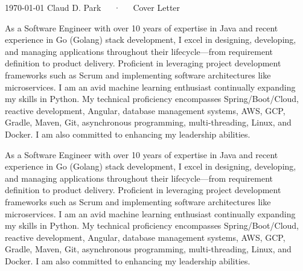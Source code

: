 \documentclass[11pt, a4paper]{awesome-cv}
\begin{document}
\makecvheader[R]

\makecvfooter
  {\today}
  {Claud D. Park~~~·~~~Cover Letter}
  {}

\makelettertitle

\begin{cvletter}



As a Software Engineer with over 10 years of expertise in Java and recent experience in Go (Golang) stack development, I excel in designing, developing, and managing applications throughout their lifecycle—from requirement definition to product delivery. Proficient in leveraging project development frameworks such as Scrum and implementing software architectures like microservices. I am an avid machine learning enthusiast continually expanding my skills in Python. My technical proficiency encompasses Spring/Boot/Cloud, reactive development, Angular, database management systems, AWS, GCP, Gradle, Maven, Git, asynchronous programming, multi-threading, Linux, and Docker. I am also committed to enhancing my leadership abilities.

As a Software Engineer with over 10 years of expertise in Java and recent experience in Go (Golang) stack development, I excel in designing, developing, and managing applications throughout their lifecycle—from requirement definition to product delivery. Proficient in leveraging project development frameworks such as Scrum and implementing software architectures like microservices. I am an avid machine learning enthusiast continually expanding my skills in Python. My technical proficiency encompasses Spring/Boot/Cloud, reactive development, Angular, database management systems, AWS, GCP, Gradle, Maven, Git, asynchronous programming, multi-threading, Linux, and Docker. I am also committed to enhancing my leadership abilities.

\end{cvletter}


\makeletterclosing
\end{document}
